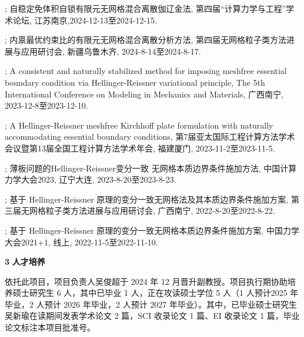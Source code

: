 \begin{enumerate}[label = {[\arabic*]},leftmargin=19pt,itemsep=5pt plus 0.3ex]
	\zhkai\ensong\fontsize{12pt}{22pt}\selectfont%
	\setlength{\baselineskip}{15pt}
    \item \textbf{}; 自稳定免体积自锁有限元无网格混合离散伽辽金法, 第四届“计算力学与工程”学术论坛, 江苏南京,2024-12-13至2024-12-15.
    \item \textbf{}; 内禀最优约束比的有限元无网格混合离散分析方法, 第四届无网格粒子类方法进展与应用研讨会, 新疆乌鲁木齐, 2024-8-14至2024-8-17.
    \item \textbf{}; A consistent and naturally stabilized method for imposing meshfree essential boundary condition via Hellinger-Reissner variational principle, The 5th International Conference on Modeling in Mechanics and Materials, 广西南宁, 2023-12-8至2023-12-10.
    \item \textbf{}; A Hellinger-Reissner meshfree Kirchhoff plate formulation with naturally accommodating essential boundary conditions, 第7届亚太国际工程计算方法学术会议暨第13届全国工程计算方法学术年会, 福建厦门, 2023-11-2至2023-11-5.
    \item \textbf{}; 薄板问题的Hellinger-Reissner变分一致 无网格本质边界条件施加方法, 中国计算力学大会2023, 辽宁大连, 2023-8-20至2023-8-23.
    \item \textbf{}; 基于 Hellinger-Reissner 原理的变分一致无网格法及其本质边界条件施加方案, 第三届无网格粒子类方法进展与应用研讨会, 广西南宁, 2022-8-20至2022-8-22.
    \item \textbf{}; 基于 Hellinger-Reissner 原理的变分一致无网格本质边界条件施加方案, 中国力学大会2021+1, 线上, 2022-11-5至2022-11-10.
\end{enumerate}

\noindent\textcircled{\textbf{\small 3}}
\textbf{人才培养}

依托此项目，项目负责人吴俊超于 2024 年 12 月晋升副教授。项目执行期协助培养硕士研究生 6 人，其中已毕业 1 人，正在攻读硕士学位 5 人（1 人预计2025 年毕业，2 人预计 2026 年毕业，2 人预计 2027 年毕业）。其中，已毕业硕士研究生吴新瑜在读期间发表学术论文 2 篇，SCI 收录论文 1 篇、EI 收录论文 1 篇，毕业论文标注本项目批准号。

